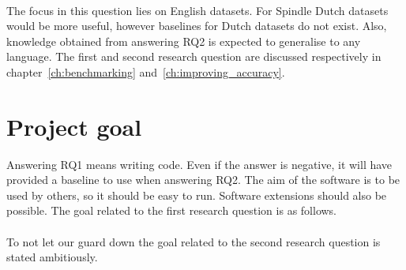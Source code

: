 \rqtwo \\[1mm]

The focus in this question lies on English datasets.
For Spindle Dutch datasets would be more useful, however baselines for Dutch datasets do not exist.
Also, knowledge obtained from answering RQ2 is expected to generalise to any language.
The first and second research question are discussed respectively in chapter~\ref{ch:benchmarking} and~\ref{ch:improving_accuracy}.

\section{Project goal}
\label{sec:project_goal}
Answering RQ1 means writing code.
Even if the answer is negative, it will have provided a baseline to use when answering RQ2.
The aim of the software is to be used by others, so it should be easy to run.
Software extensions should also be possible.
The goal related to the first research question is as follows.\\

\rgone \\

\noindent To not let our guard down the goal related to the second research question is stated ambitiously.\\

\rgtwo